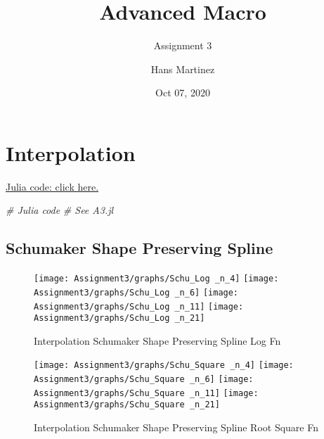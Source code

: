 \documentclass[]{article}
\title{Advanced Macro}
\subtitle{Assignment 3}
\author{Hans Martinez}
\date{Oct 07, 2020}
\newenvironment{Shaded}{\begin{snugshade}}{\end{snugshade}}
\newcommand{\CommentTok}[1]{\textcolor[rgb]{0.56,0.35,0.01}{\textit{#1}}}
\begin{document}
\maketitle

\hypertarget{interpolation}{%
\section{Interpolation}\label{interpolation}}

\href{https://github.com/hans-mtz/AdvMacro/blob/master/A3.jl}{Julia
code: click here.}

\begin{Shaded}
\begin{Highlighting}[]
\CommentTok{# Julia code}
\CommentTok{# See A3.jl}
\end{Highlighting}
\end{Shaded}

\hypertarget{schumaker-shape-preserving-spline}{%
\subsection{Schumaker Shape Preserving
Spline}\label{schumaker-shape-preserving-spline}}

\begin{figure}

{\centering \texttt{[image: Assignment3/graphs/Schu\_Log \_n\_4]} \texttt{[image: Assignment3/graphs/Schu\_Log \_n\_6]} \texttt{[image: Assignment3/graphs/Schu\_Log \_n\_11]} \texttt{[image: Assignment3/graphs/Schu\_Log \_n\_21]} 

}

\caption{Interpolation Schumaker Shape Preserving Spline Log Fn}\label{fig:unnamed-chunk-2}
\end{figure}

\begin{figure}

{\centering \texttt{[image: Assignment3/graphs/Schu\_Square \_n\_4]} \texttt{[image: Assignment3/graphs/Schu\_Square \_n\_6]} \texttt{[image: Assignment3/graphs/Schu\_Square \_n\_11]} \texttt{[image: Assignment3/graphs/Schu\_Square \_n\_21]} 

}

\caption{Interpolation Schumaker Shape Preserving Spline Root Square Fn}\label{fig:unnamed-chunk-3}
\end{figure}
\end{document}
